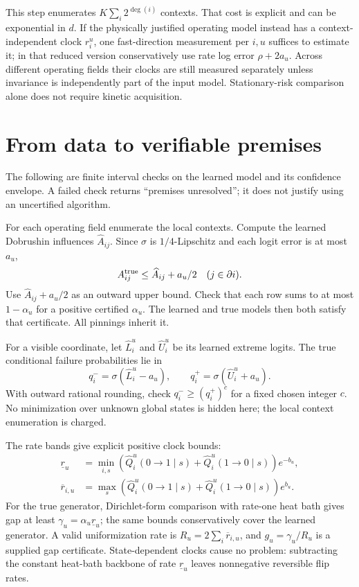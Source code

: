 \documentclass[11pt]{article}
\newcommand{\sig}{\sigma}
\begin{document}
This step enumerates $K\sum_i2^{\deg(i)}$ contexts. That cost is explicit and can be exponential in $d$. If the physically justified operating model instead has a context-independent clock $r_i^u$, one fast-direction measurement per $i,u$ suffices to estimate it; in that reduced version conservatively use rate log error $\rho+2a_u$. Across different operating fields their clocks are still measured separately unless invariance is independently part of the input model. Stationary-risk comparison alone does not require kinetic acquisition.

\section{From data to verifiable premises}
\label{sec:checks}
The following are finite interval checks on the learned model and its confidence envelope. A failed check returns ``premises unresolved''; it does not justify using an uncertified algorithm.

For each operating field enumerate the local contexts. Compute the learned Dobrushin influences $\widehat A_{ij}$. Since $\sig$ is $1/4$-Lipschitz and each logit error is at most $a_u$,
\begin{equation}
 A_{ij}^{\rm true}\le\widehat A_{ij}+a_u/2\quad(j\in\partial i).
 \label{eq:influence}
\end{equation}
Use $\widehat A_{ij}+a_u/2$ as an outward upper bound. Check that each row sums to at most $1-\alpha_u$ for a positive certified $\alpha_u$. The learned and true models then both satisfy that certificate. All pinnings inherit it.

For a visible coordinate, let $\widehat L_i^u$ and $\widehat U_i^u$ be its learned extreme logits. The true conditional failure probabilities lie in
\[
 q_i^- =\sig(\widehat L_i^u-a_u),\qquad q_i^+ =\sig(\widehat U_i^u+a_u).
\]
With outward rational rounding, check $q_i^-\ge(q_i^+)^c$ for a fixed chosen integer $c$. No minimization over unknown global states is hidden here; the local context enumeration is charged.

The rate bands give explicit positive clock bounds:
\[
 \begin{aligned}
 \underline r_u&=\min_{i,s}\left(\widehat Q_i^u(0\to1\mid s)+\widehat Q_i^u(1\to0\mid s)\right)e^{-b_u},\\
 \overline r_{i,u}&=\max_s\left(\widehat Q_i^u(0\to1\mid s)+\widehat Q_i^u(1\to0\mid s)\right)e^{b_u}.
 \end{aligned}
\]
For the true generator, Dirichlet-form comparison with rate-one heat bath gives gap at least $\gamma_u=\alpha_u\underline r_u$; the same bounds conservatively cover the learned generator. A valid uniformization rate is $R_u=2\sum_i\overline r_{i,u}$, and $g_u=\gamma_u/R_u$ is a supplied gap certificate. State-dependent clocks cause no problem: subtracting the constant heat-bath backbone of rate $\underline r_u$ leaves nonnegative reversible flip rates.
\end{document}
